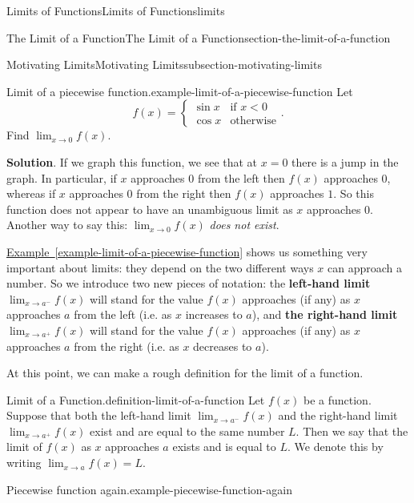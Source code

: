 \documentclass[oneside,10pt,]{book}
\newcommand{\terminology}[1]{\textbf{#1}}
\numberwithin{equation}{section}
\begin{document}
\begin{chapterptx}{Limits of Functions}{}{Limits of Functions}{}{}{limits}
\begin{sectionptx}{The Limit of a Function}{}{The Limit of a Function}{}{}{section-the-limit-of-a-function}
\begin{subsectionptx}{Motivating Limits}{}{Motivating Limits}{}{}{subsection-motivating-limits}
\begin{example}{Limit of a piecewise function.}{example-limit-of-a-piecewise-function}%
\hypertarget{p-10}{}%
Let%
%
\begin{equation*}
f(x) = \begin{cases} \sin x & \text{if $x<0$} \\ \cos x & \text{otherwise} \end{cases}.
\end{equation*}
\hypertarget{p-11}{}%
Find \(\lim_{x\to0}f(x)\).%
\par\smallskip%
\noindent\textbf{Solution}.\hypertarget{solution-2}{}\quad%
\hypertarget{p-12}{}%
If we graph this function, we see that at \(x=0\) there is a jump in the graph. In particular, if \(x\) approaches \(0\) from the left then \(f(x)\) approaches \(0\), whereas if \(x\) approaches \(0\) from the right then \(f(x)\) approaches \(1\). So this function does not appear to have an unambiguous limit as \(x\) approaches \(0\). Another way to say this: \(\lim_{x\to0}f(x)\) \emph{does not exist}.%
\end{example}
\hypertarget{p-13}{}%
\hyperref[example-limit-of-a-piecewise-function]{Example~\ref{example-limit-of-a-piecewise-function}} shows us something very important about limits: they depend on the two different ways \(x\) can approach a number. So we introduce two new pieces of notation: the \terminology{left-hand limit} \(\lim_{x\to a^{-}}f(x)\) will stand for the value \(f(x)\) approaches (if any) as \(x\) approaches \(a\) from the left (i.e. as \(x\) increases to \(a\)), and \terminology{the right-hand limit} \(\lim_{x\to a^{+}}f(x)\) will stand for the value \(f(x)\) approaches (if any) as \(x\) approaches \(a\) from the right (i.e. as \(x\) decreases to \(a\)).%
\par
\hypertarget{p-14}{}%
At this point, we can make a rough definition for the limit of a function.%
\begin{definition}{Limit of a Function.}{definition-limit-of-a-function}%
\hypertarget{p-15}{}%
Let \(f(x)\) be a function. Suppose that both the left-hand limit \(\lim_{x\to a^{-}}f(x)\) and the right-hand limit \(\lim_{x\to a^{+}}f(x)\) exist and are equal to the same number \(L\). Then we say that the limit of \(f(x)\) as \(x\) approaches \(a\) exists and is equal to \(L\). We denote this by writing \(\lim_{x\to a}f(x) = L\).%
\end{definition}
\begin{example}{Piecewise function again.}{example-piecewise-function-again}%

\end{example}
\end{subsectionptx}
\end{sectionptx}
\end{chapterptx}
\end{document}
